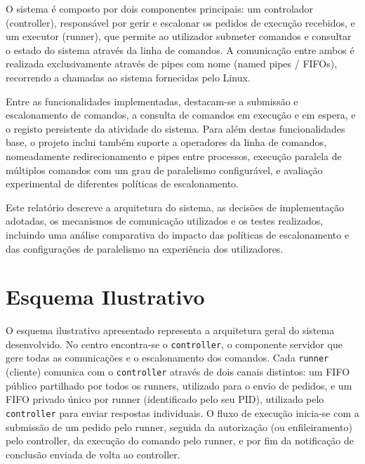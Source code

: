 \documentclass[runningheads,11pt]{llncs}
\begin{document}
        O sistema é composto por dois componentes principais: um controlador (controller), responsável por gerir e 
        escalonar os pedidos de execução recebidos, e um executor (runner), que permite ao utilizador submeter comandos 
        e consultar o estado do sistema através da linha de comandos. A comunicação entre ambos é realizada exclusivamente 
        através de pipes com nome (named pipes / FIFOs), recorrendo a chamadas ao sistema fornecidas pelo Linux.

        Entre as funcionalidades implementadas, destacam-se a submissão e escalonamento de comandos, a consulta 
        de comandos em execução e em espera, e o registo persistente da atividade do sistema. Para além destas 
        funcionalidades base, o projeto inclui também suporte a operadores da linha de comandos, nomeadamente 
        redirecionamento e pipes entre processos, execução paralela de múltiplos comandos com um grau de paralelismo 
        configurável, e avaliação experimental de diferentes políticas de escalonamento.
        
        Este relatório descreve a arquitetura do sistema, as decisões de implementação adotadas, 
        os mecanismos de comunicação utilizados e os testes realizados, incluindo uma análise comparativa 
        do impacto das políticas de escalonamento e das configurações de paralelismo na experiência dos utilizadores.
        
        \newpage
        
        \section{Esquema Ilustrativo}

        O esquema ilustrativo apresentado representa a arquitetura geral do sistema 
        desenvolvido. No centro encontra-se o \texttt{controller}, o componente servidor
        que gere todas as comunicações e o escalonamento dos comandos. 
        Cada \texttt{runner} (cliente) comunica com o \texttt{controller} através de dois 
        canais distintos: um FIFO público partilhado por todos os runners, utilizado para 
        o envio de pedidos, e um FIFO privado único por runner (identificado pelo seu PID), 
        utilizado pelo \texttt{controller} para enviar respostas individuais. O fluxo de 
        execução inicia-se com a submissão de um pedido pelo runner, seguida da autorização 
        (ou enfileiramento) pelo controller, da execução do comando pelo runner, e por fim da
        notificação de conclusão enviada de volta ao controller.
\end{document}

